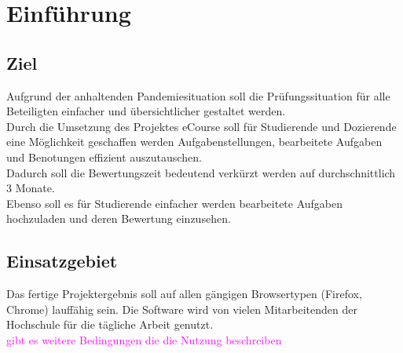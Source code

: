 
\chapter{Einführung}

\section{Ziel}
Aufgrund der anhaltenden Pandemiesituation soll die Prüfungssituation für alle Beteiligten einfacher und übersichtlicher gestaltet werden. \\
Durch die Umsetzung des Projektes eCourse soll für Studierende und Dozierende eine Möglichkeit geschaffen werden Aufgabenstellungen, bearbeitete Aufgaben und Benotungen effizient auszutauschen. \\
Dadurch soll die Bewertungszeit bedeutend verkürzt werden auf durchschnittlich 3 Monate. \\
Ebenso soll es für Studierende einfacher werden bearbeitete Aufgaben hochzuladen und deren Bewertung einzusehen. \\

\section{Einsatzgebiet}
Das fertige Projektergebnis soll auf allen gängigen Browsertypen (Firefox, Chrome) lauffähig sein. Die Software wird von vielen Mitarbeitenden der Hochschule für die tägliche Arbeit genutzt. \\
\textcolor{magenta}{gibt es weitere Bedingungen die die Nutzung beschreiben}

